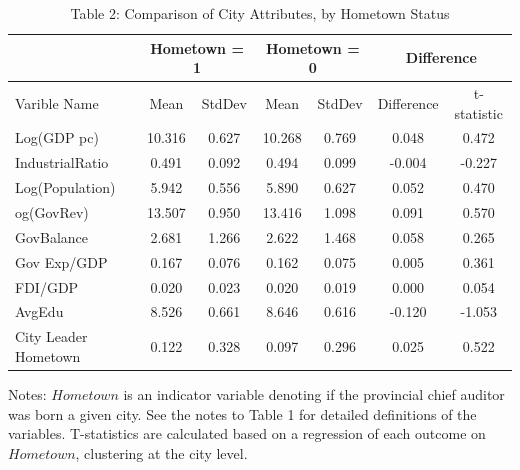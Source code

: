 \begin{table}[p]\centering\footnotesize{
\captionsetup{width=\textwidth,labelformat=empty}
\caption{Table 2: Comparison of City Attributes, by Hometown Status}
\begin{threeparttable}
\begin{tabular}{l  c c c c c c}
\hline\hline
\; & \multicolumn{2}{c}{Hometown = 1} & \multicolumn{2}{c}{Hometown = 0} & \multicolumn{2}{c}{Difference}  \\
\hline
Varible Name & Mean & StdDev & Mean & StdDev & Difference & t-statistic  \\
\hline
Log(GDP pc)&10.316&0.627&10.268&0.769&0.048&0.472\\
IndustrialRatio&0.491&0.092&0.494&0.099&-0.004&-0.227\\
Log(Population)&5.942&0.556&5.890&0.627&0.052&0.470\\
og(GovRev)&13.507&0.950&13.416&1.098&0.091&0.570\\
GovBalance&2.681&1.266&2.622&1.468&0.058&0.265\\
Gov Exp/GDP&0.167&0.076&0.162&0.075&0.005&0.361\\
FDI/GDP&0.020&0.023&0.020&0.019&0.000&0.054\\
AvgEdu&8.526&0.661&8.646&0.616&-0.120&-1.053\\
City Leader Hometown&0.122&0.328&0.097&0.296&0.025&0.522\\
\hline\hline
\end{tabular}
\captionsetup{justification=justified,labelformat=empty}
\begin{tablenotes}\item Notes: $ Hometown $ is an indicator variable denoting if the provincial chief auditor was born a given city. See the notes to Table 1 for detailed definitions of the variables. T-statistics are calculated based on a regression of each outcome on $ Hometown $, clustering at the city level. \end{tablenotes}
\end{threeparttable}}\end{table}

